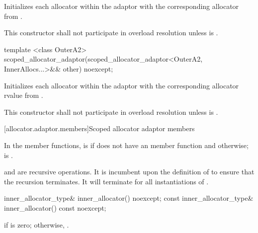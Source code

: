 \begin{itemdescr}
\pnum
\effects Initializes each allocator within the adaptor with the corresponding allocator
from .

\pnum
\remarks This constructor shall not participate in overload resolution unless
 is .
\end{itemdescr}

%
\begin{itemdecl}
template <class OuterA2>
  scoped_allocator_adaptor(scoped_allocator_adaptor<OuterA2,
                                                    InnerAllocs...>&& other) noexcept;
\end{itemdecl}

\begin{itemdescr}
\pnum
\effects Initializes each allocator within the adaptor with the corresponding allocator rvalue
from .

\pnum
\remarks This constructor shall not participate in overload resolution unless
 is .
\end{itemdescr}

[allocator.adaptor.members]{Scoped allocator adaptor members}

\pnum
In the  member functions,
 is  if  does not have an
 member function and
otherwise;
 is
.
\begin{note}  and
 are recursive operations. It
is incumbent upon the definition of  to ensure that the
recursion terminates. It will terminate for all instantiations of
. \end{note}

%
\begin{itemdecl}
inner_allocator_type& inner_allocator() noexcept;
const inner_allocator_type& inner_allocator() const noexcept;
\end{itemdecl}

\begin{itemdescr}
\pnum
\returns {} if  is zero; otherwise,
.
\end{itemdescr}

